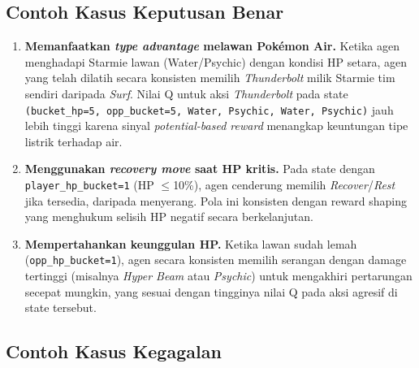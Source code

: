 \documentclass[11pt,a4paper,oneside]{report}
\begin{document}
\subsection*{Contoh Kasus Keputusan Benar}

\begin{enumerate}[leftmargin=*]
    \item \textbf{Memanfaatkan \textit{type advantage} melawan Pokémon Air.} Ketika agen menghadapi Starmie lawan (Water/Psychic) dengan kondisi HP setara, agen yang telah dilatih secara konsisten memilih \textit{Thunderbolt} milik Starmie tim sendiri daripada \textit{Surf}. Nilai Q untuk aksi \textit{Thunderbolt} pada state \texttt{(bucket\_hp=5, opp\_bucket=5, Water, Psychic, Water, Psychic)} jauh lebih tinggi karena sinyal \textit{potential-based reward} menangkap keuntungan tipe listrik terhadap air.
    \item \textbf{Menggunakan \textit{recovery move} saat HP kritis.} Pada state dengan \texttt{player\_hp\_bucket=1} (HP $\leq$10\%), agen cenderung memilih \textit{Recover}/\textit{Rest} jika tersedia, daripada menyerang. Pola ini konsisten dengan reward shaping yang menghukum selisih HP negatif secara berkelanjutan.
    \item \textbf{Mempertahankan keunggulan HP.} Ketika lawan sudah lemah (\texttt{opp\_hp\_bucket=1}), agen secara konsisten memilih serangan dengan damage tertinggi (misalnya \textit{Hyper Beam} atau \textit{Psychic}) untuk mengakhiri pertarungan secepat mungkin, yang sesuai dengan tingginya nilai Q pada aksi agresif di state tersebut.
\end{enumerate}

\subsection*{Contoh Kasus Kegagalan}
\end{document}
